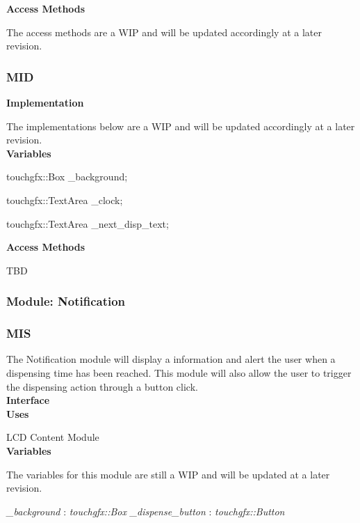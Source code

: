 \documentclass[12pt,titlepage]{article}
\begin{document}
\noindent \textbf{Access Methods}

\noindent The access methods are a WIP and will be updated accordingly at a later revision.

\subsubsection*{MID}

\noindent \textbf{Implementation} 

\noindent The implementations below are a WIP and will be updated accordingly at a later revision.\\

\noindent \textbf{Variables}

touchgfx::Box \_background; \par
touchgfx::TextArea \_clock; \par
touchgfx::TextArea \_next\_disp\_text; \newline

\noindent \textbf{Access Methods} 

TBD


\subsubsection{Module: Notification}
\subsubsection*{MIS}

\noindent The Notification module will display a information and alert the user when a dispensing time has been reached. This module will also allow the user to trigger the dispensing action through a button click.  \\

\noindent \textbf{Interface} \\

\noindent \textbf{Uses}

\noindent LCD Content Module \\

\noindent \textbf{Variables}

\noindent The variables for this module are still a WIP and will be updated at a later revision. \newline

\noindent \textit{\_background} : \textit{touchgfx::Box} \newline
\noindent \textit{\_dispense\_button} : \textit{touchgfx::Button} \newline
\end{document}
